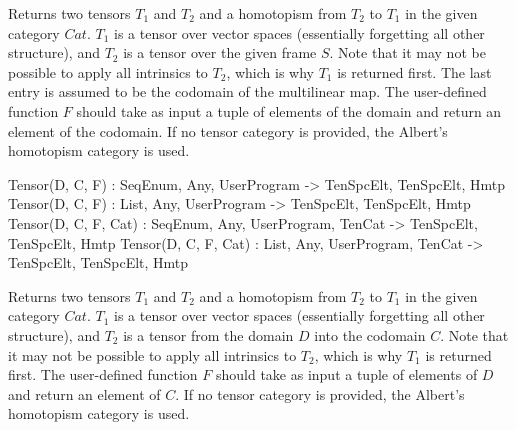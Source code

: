 Returns two tensors $T_1$ and $T_2$ and a homotopism from $T_2$ to $T_1$ in the given category $Cat$. 
$T_1$ is a tensor over vector spaces (essentially forgetting all other structure), and $T_2$ is a tensor over the given frame $S$. 
Note that it may not be possible to apply all intrinsics to $T_2$, which is why $T_1$ is returned first. 
The last entry is assumed to be the codomain of the multilinear map. 
The user-defined function $F$ should take as
input a tuple of elements of the domain and return an element of the codomain.
If no tensor category is provided, the Albert's homotopism category is used.


\begin{intrinsics}
Tensor(D, C, F) : SeqEnum, Any, UserProgram -> TenSpcElt, TenSpcElt, Hmtp
Tensor(D, C, F) : List, Any, UserProgram -> TenSpcElt, TenSpcElt, Hmtp
Tensor(D, C, F, Cat) : SeqEnum, Any, UserProgram, TenCat -> TenSpcElt, TenSpcElt, Hmtp
Tensor(D, C, F, Cat) : List, Any, UserProgram, TenCat -> TenSpcElt, TenSpcElt, Hmtp
\end{intrinsics}

Returns two tensors $T_1$ and $T_2$ and a homotopism from $T_2$ to $T_1$ in the given category $Cat$. 
$T_1$ is a tensor over vector spaces (essentially forgetting all other structure), and $T_2$ is a tensor from the domain $D$ into the codomain $C$. 
Note that it may not be possible to apply all intrinsics to $T_2$, which is why $T_1$ is returned first. 
The user-defined function $F$ should take as input a tuple of elements of $D$ and return an element of $C$.
If no tensor category is provided, the Albert's homotopism category is used.

